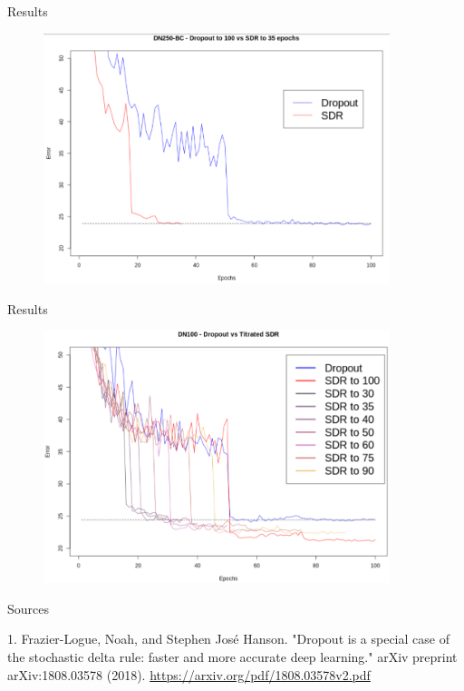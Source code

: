 \documentclass{beamer}
\begin{document}
\begin{frame}{Results}
\begin{figure}[h]
\includegraphics[width=0.9\textwidth]{img/dropout_vs_sdr}
\end{figure}
\end{frame}
\begin{frame}{Results}
\begin{figure}[h]
\includegraphics[width=0.9\textwidth]{img/titrated}
\end{figure}
\end{frame}

\begin{frame}{Sources}

\begin{thebibliography}{0}

   1. Frazier-Logue, Noah, and Stephen José Hanson. "Dropout is a special case of the stochastic delta rule: faster and more accurate deep learning." arXiv preprint arXiv:1808.03578 (2018). \url{https://arxiv.org/pdf/1808.03578v2.pdf}
  
\end{thebibliography}

\end{frame}

 
 
 
\end{document}
